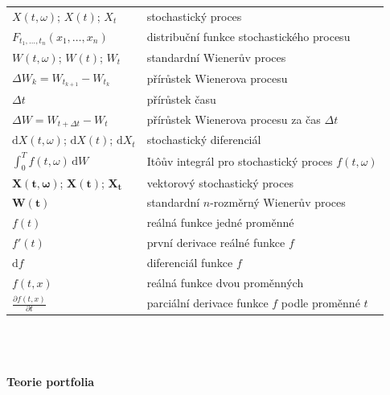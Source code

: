 \documentclass[a4paper,12pt]{report}
\theoremstyle{definition} \newtheorem{definice}[veta]{Definice}
\theoremstyle{remark}
\begin{document}
   \begin{tabular}{p{4cm} p{9.3cm}}
     $X(t,\omega)$; $X(t)$; $X_t$                       &   stochastický proces \\
   $F_{t_1,\dots,t_n}(x_1,\dots,x_n)$                       &  distribuční funkce stochastického procesu \\
   $W(t,\omega)$; $W(t)$; $W_t$                       &   standardní Wienerův proces \\
   $\Delta W_k=W_{t_{k+1}}-W_{t_k}$				 &   přírůstek Wienerova procesu \\
   $\Delta t$						& přírůstek času \\
   $\Delta W=W_{t+\Delta t}-W_{t}$				 &   přírůstek Wienerova procesu za čas $\Delta t$\\
   $\mathrm{d}X(t,\omega)$; $\mathrm{d}X(t)$; $\mathrm{d}X_t$    &  stochastický diferenciál \\ %
   $\int_0^Tf(t,\omega)\,\mathrm{d}W$                              &   It\^oův integrál pro stochastický proces $f(t,\omega)$ \\
   $\boldsymbol{X}(\boldsymbol{t},\boldsymbol{\omega})$; $\boldsymbol{X}(\boldsymbol{t})$; $\boldsymbol{X}_{\boldsymbol{t}}$  		& vektorový stochastický proces\\
   $\boldsymbol{W}(\boldsymbol{t})$ 		& standardní $n$-rozměrný Wienerův proces\\
   $f(t)$				& reálná funkce jedné proměnné\\
   $f'(t)$				& první derivace reálné funkce $f$\\
   $\mathrm{d}f$				& diferenciál funkce $f$\\
   $f(t,x)$				& reálná funkce dvou proměnných\\
   $\frac{\partial f(t,x)}{\partial t}$				& parciální derivace funkce $f$ podle proměnné $t$
   \end{tabular}\\\\\\
%
%
\newpage \noindent
\textbf{Teorie portfolia}\\\\
\end{document}
